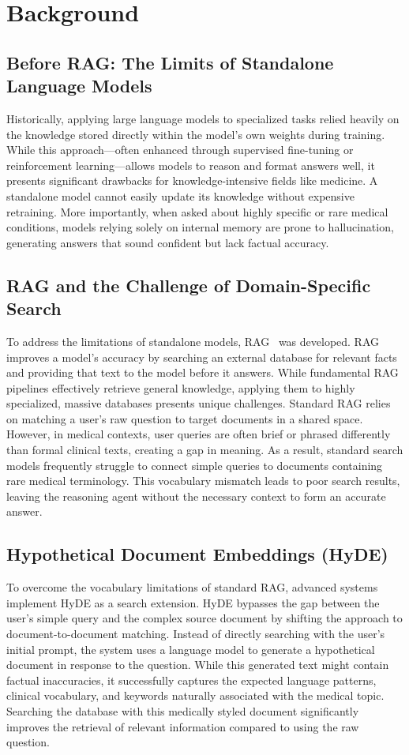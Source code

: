 \section{Background}
\label{sec:background}

\subsection{Before RAG: The Limits of Standalone Language Models}
Historically, applying large language models to specialized tasks relied heavily on the knowledge stored directly within the model's own weights during training. While this approach—often enhanced through supervised fine-tuning or reinforcement learning—allows models to reason and format answers well, it presents significant drawbacks for knowledge-intensive fields like medicine. A standalone model cannot easily update its knowledge without expensive retraining. More importantly, when asked about highly specific or rare medical conditions, models relying solely on internal memory are prone to hallucination, generating answers that sound confident but lack factual accuracy.

\subsection{RAG and the Challenge of Domain-Specific Search}
To address the limitations of standalone models, RAG~\cite{lewis2021rag} was developed. RAG improves a model's accuracy by searching an external database for relevant facts and providing that text to the model before it answers. While fundamental RAG pipelines effectively retrieve general knowledge, applying them to highly specialized, massive databases presents unique challenges. Standard RAG relies on matching a user's raw question to target documents in a shared space. However, in medical contexts, user queries are often brief or phrased differently than formal clinical texts, creating a gap in meaning. As a result, standard search models frequently struggle to connect simple queries to documents containing rare medical terminology. This vocabulary mismatch leads to poor search results, leaving the reasoning agent without the necessary context to form an accurate answer.

\subsection{Hypothetical Document Embeddings (HyDE)}
To overcome the vocabulary limitations of standard RAG, advanced systems implement HyDE as a search extension. HyDE bypasses the gap between the user's simple query and the complex source document by shifting the approach to document-to-document matching. Instead of directly searching with the user's initial prompt, the system uses a language model to generate a hypothetical document in response to the question. While this generated text might contain factual inaccuracies, it successfully captures the expected language patterns, clinical vocabulary, and keywords naturally associated with the medical topic. Searching the database with this medically styled document significantly improves the retrieval of relevant information compared to using the raw question.

